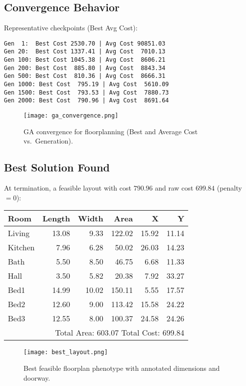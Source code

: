 \documentclass{article}
\begin{document}
\subsection{Convergence Behavior}
Representative checkpoints (Best \textbar{} Avg Cost):
\begin{verbatim}
Gen  1:  Best Cost 2530.70 | Avg Cost 90851.03
Gen 20:  Best Cost 1337.41 | Avg Cost  7010.13
Gen 100: Best Cost 1045.38 | Avg Cost  8606.21
Gen 200: Best Cost  885.80 | Avg Cost  8843.34
Gen 500: Best Cost  810.36 | Avg Cost  8666.31
Gen 1000: Best Cost  795.19 | Avg Cost  5610.09
Gen 1500: Best Cost  793.53 | Avg Cost  7880.73
Gen 2000: Best Cost  790.96 | Avg Cost  8691.64
\end{verbatim}

\begin{figure}[H]
    \centering
    \texttt{[image: ga\_convergence.png]}
    \caption{GA convergence for floorplanning (Best and Average Cost vs.\ Generation).}
\end{figure}

\subsection{Best Solution Found}
At termination, a feasible layout with cost $790.96$ and raw cost $699.84$ (penalty $=0$):
\begin{center}
\begin{tabular}{lrrrrr}
\toprule
Room & Length & Width & Area & X & Y \\
\midrule
Living  & 13.08 &  9.33 & 122.02 & 15.92 & 11.14 \\
Kitchen &  7.96 &  6.28 &  50.02 & 26.03 & 14.23 \\
Bath    &  5.50 &  8.50 &  46.75 &  6.68 & 11.33 \\
Hall    &  3.50 &  5.82 &  20.38 &  7.92 & 33.27 \\
Bed1    & 14.99 & 10.02 & 150.11 &  5.55 & 17.57 \\
Bed2    & 12.60 &  9.00 & 113.42 & 15.58 & 24.22 \\
Bed3    & 12.55 &  8.00 & 100.37 & 24.58 & 24.26 \\
\midrule
\multicolumn{6}{r}{Total Area: 603.07 \qquad Total Cost: 699.84} \\
\bottomrule
\end{tabular}
\end{center}

\begin{figure}[H]
    \centering
    \texttt{[image: best\_layout.png]}
    \caption{Best feasible floorplan phenotype with annotated dimensions and doorway.}
\end{figure}
\end{document}
